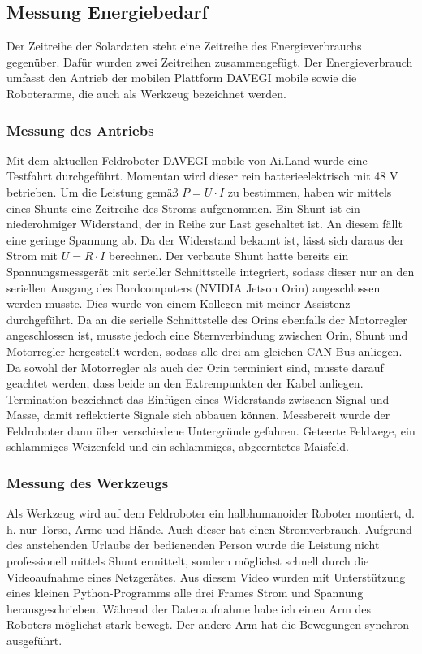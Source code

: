 \subsection{Messung Energiebedarf}
Der Zeitreihe der Solardaten steht eine Zeitreihe des Energieverbrauchs gegenüber. Dafür wurden zwei Zeitreihen zusammengefügt. Der Energieverbrauch umfasst den Antrieb der mobilen Plattform DAVEGI mobile sowie die Roboterarme, die auch als Werkzeug bezeichnet werden.
\subsubsection{Messung des Antriebs}
Mit dem aktuellen Feldroboter DAVEGI mobile von Ai.Land wurde eine Testfahrt durchgeführt. Momentan wird dieser rein batterieelektrisch mit 48 V betrieben. Um die Leistung gemäß $P = U \cdot I$ zu bestimmen, haben wir mittels eines Shunts eine Zeitreihe des Stroms aufgenommen. Ein Shunt ist ein niederohmiger Widerstand, der in Reihe zur Last geschaltet ist. An diesem fällt eine geringe Spannung ab. Da der Widerstand bekannt ist, lässt sich daraus der Strom mit $U = R \cdot I$ berechnen.
Der verbaute Shunt hatte bereits ein Spannungsmessgerät mit serieller Schnittstelle integriert, sodass dieser nur an den seriellen Ausgang des Bordcomputers (NVIDIA Jetson Orin) angeschlossen werden musste. Dies wurde von einem Kollegen mit meiner Assistenz durchgeführt. Da an die serielle Schnittstelle des Orins ebenfalls der Motorregler angeschlossen ist, musste jedoch eine Sternverbindung zwischen Orin, Shunt und Motorregler hergestellt werden, sodass alle drei am gleichen CAN-Bus anliegen. Da sowohl der Motorregler als auch der Orin terminiert sind, musste darauf geachtet werden, dass beide an den Extrempunkten der Kabel anliegen. Termination bezeichnet das Einfügen eines Widerstands zwischen Signal und Masse, damit reflektierte Signale sich abbauen können. Messbereit wurde der Feldroboter dann über verschiedene Untergründe gefahren. Geteerte Feldwege, ein schlammiges Weizenfeld und ein schlammiges, abgeerntetes Maisfeld.
\subsubsection{Messung des Werkzeugs}
Als Werkzeug wird auf dem Feldroboter ein halbhumanoider Roboter montiert, d. h. nur Torso, Arme und Hände. Auch dieser hat einen Stromverbrauch. Aufgrund des anstehenden Urlaubs der bedienenden Person wurde die Leistung nicht professionell mittels Shunt ermittelt, sondern möglichst schnell durch die Videoaufnahme eines Netzgerätes. Aus diesem Video wurden mit Unterstützung eines kleinen Python-Programms alle drei Frames Strom und Spannung herausgeschrieben. Während der Datenaufnahme habe ich einen Arm des Roboters möglichst stark bewegt. Der andere Arm hat die Bewegungen synchron ausgeführt.
